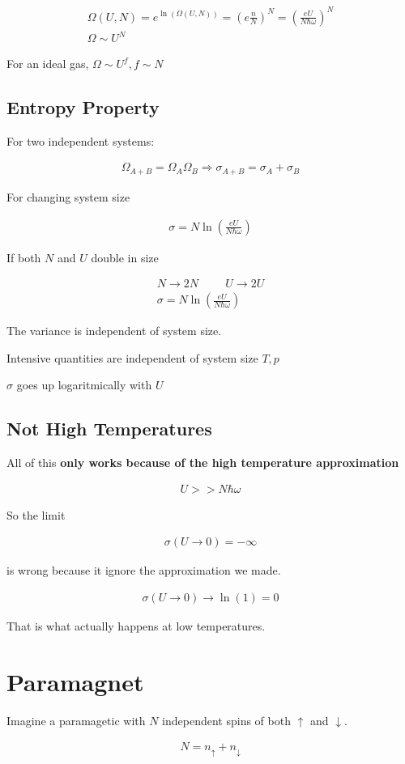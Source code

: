 \documentclass[fleqn]{report}
\newcommand{\hp}{\hspace{1cm}}
\newcommand{\equations} [1] {
\begin{gather*}
#1
\end{gather*}
}
\begin{document}
\equations{
    \Omega(U, N)
    =
    e^{\ln(\Omega(U, N))}
    =
    (e \frac{n}{N})^N
    =
    \left(
        \frac{eU}{N \hbar \omega}
    \right)^N
    \\
    \Omega 
    \sim 
    U^N
}

For an ideal gas, $\Omega \sim U^f, f \sim N$ 

\subsection{Entropy Property}
For two independent systems: 

\equations{
    \Omega_{A + B}
    =
    \Omega_A
    \Omega_B
    \Rightarrow 
    \sigma_{A+B}
    =
    \sigma_A
    +
    \sigma_B
}

For changing system size

\equations{
    \sigma 
    =
    N 
    \ln(\frac{e U}{N \hbar \omega})
}

If both $N$ and $U$ double in size 

\equations{
    N \to 2N
    \hp 
    U \to 2U
    \\
    \sigma 
    =
    N 
    \ln(\frac{e U}{N \hbar \omega})
}

The variance is independent of system size. 

Intensive quantities are independent of system size $T, p$

$\sigma$ goes up logaritmically with $U$

\subsection{Not High Temperatures}
All of this \textbf{only works because of the high temperature 
approximation}

\equations{
    U >> N \hbar \omega
}

So the limit 
\equations{
    \sigma(U \to 0)
    =
    - \infty
}
is wrong because it ignore the approximation we made. 

\equations{
    \sigma(U \to 0)
    \rightarrow 
    \ln(1)
    =
    0
}
That is what actually happens at low temperatures.

\section{Paramagnet}
Imagine a paramagetic with $N$ independent spins of both $\uparrow$ 
and $\downarrow$. 

\equations{
    N = n_{\uparrow}
    +
    n_{\downarrow}
}
\end{document}
